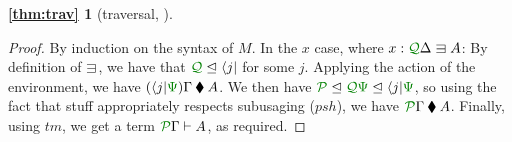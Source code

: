 \documentclass[submission,copyright,creativecommons]{eptcs}
\begin{document}
\newtheorem*{thm:trav}{\autoref{thm:trav}}
\begin{thm:trav}[traversal, \href{https://github.com/laMudri/generic-lr/blob/lin/tlla-submission-2021/src/Specific/Syntax/Traversal.agda\#L83}{}]
  \thmtrav
\end{thm:trav}
\begin{proof}
  By induction on the syntax of $M$. In the  $x$ case,
  where $x : \ctx{\Delta}{Q} \lvar A$: By definition of $\lvar$, we
  have that $\resctx Q \subres \langle j \rvert$ for some $j$.
  Applying the action of the environment, we have
  $(\langle j \rvert\rescomment\Psi)\Gamma \kitrel A$.  We then have
  $\resctx P \subres \resctx Q\rescomment\Psi \subres \langle j
  \rvert\rescomment\Psi$, so using the fact that stuff appropriately
  respects subusaging ($\mathit{psh}$), we have
  $\ctx{\Gamma}{P} \kitrel A$.  Finally, using $\mathit{tm}$, we get a
  term $\ctx{\Gamma}{P} \vdash A$, as required.


\end{proof}
\end{document}
